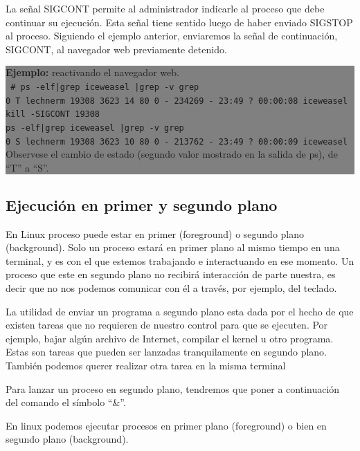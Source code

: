 \documentclass[12pt]{article}
\begin{document}
La señal SIGCONT permite al administrador indicarle al proceso que debe 
continuar su ejecución. Esta señal tiene sentido luego de haber enviado 
SIGSTOP al proceso. Siguiendo el ejemplo anterior, enviaremos la señal de
continuación, SIGCONT, al navegador web previamente detenido.  


\colorbox{grey}{\parbox[t]{0.95\linewidth}{ \vspace*{0.5cm} { 
{\bf Ejemplo:} reactivando el navegador web. \\
{\tt
\# ps -elf|grep iceweasel |grep -v grep  \\
0 T lechnerm 19308  3623 14  80   0 - 234269 -     23:49 ?    00:00:08 iceweasel \\

kill -SIGCONT 19308 \\

ps -elf|grep iceweasel |grep -v grep  \\
0 S lechnerm 19308  3623 10  80   0 - 213762 -     23:49 ?    00:00:09 iceweasel \\
}
Observese el cambio de estado (segundo valor mostrado en la salida de ps), 
de ``T'' a ``S''. 

} \vspace*{0.5cm} } }

\subsection*{Ejecución en primer y segundo plano}

En Linux proceso puede estar en primer (foreground) o segundo plano
(background). Solo un proceso estará en primer plano al mismo tiempo en
una terminal, y es con el que estemos trabajando e interactuando en ese 
momento. Un proceso que este en segundo plano no recibirá interacción  
de parte nuestra, es decir que no nos podemos comunicar con él 
a través, por ejemplo, del teclado. 

La utilidad de enviar un programa a 
segundo plano esta dada por el hecho de que existen tareas que no 
requieren de nuestro control para que se ejecuten. Por ejemplo, bajar 
algún archivo de Internet, compilar el kernel u otro programa. Estas son 
tareas que pueden ser lanzadas tranquilamente en segundo plano. También 
podemos querer realizar otra tarea en la misma terminal


Para 
lanzar un proceso en segundo plano, tendremos que poner a continuación 
del comando el símbolo ``\&''. 

En linux podemos ejecutar procesos en primer plano (foreground) o bien en segundo plano (background).
\end{document}

